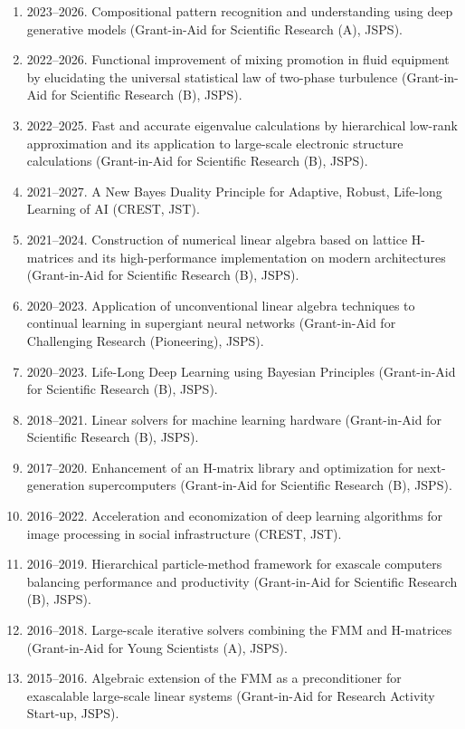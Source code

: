 \documentclass[margin,line]{cv}
\begin{document}
\begin{resume}
\begin{enumerate}
\item 2023--2026. Compositional pattern recognition and understanding using deep generative models (Grant-in-Aid for Scientific Research (A), JSPS).

\item 2022--2026. Functional improvement of mixing promotion in fluid equipment by elucidating the universal statistical law of two-phase turbulence (Grant-in-Aid for Scientific Research (B), JSPS).

\item 2022--2025. Fast and accurate eigenvalue calculations by hierarchical low-rank approximation and its application to large-scale electronic structure calculations (Grant-in-Aid for Scientific Research (B), JSPS).

\item 2021--2027. A New Bayes Duality Principle for Adaptive, Robust, Life-long Learning of AI (CREST, JST).

\item 2021--2024. Construction of numerical linear algebra based on lattice H-matrices and its high-performance implementation on modern architectures (Grant-in-Aid for Scientific Research (B), JSPS).

\item 2020--2023. Application of unconventional linear algebra techniques to continual learning in supergiant neural networks (Grant-in-Aid for Challenging Research (Pioneering), JSPS).

\item 2020--2023. Life-Long Deep Learning using Bayesian Principles (Grant-in-Aid for Scientific Research (B), JSPS).

\item 2018--2021. Linear solvers for machine learning hardware (Grant-in-Aid for Scientific Research (B), JSPS).

\item 2017--2020. Enhancement of an H-matrix library and optimization for next-generation supercomputers (Grant-in-Aid for Scientific Research (B), JSPS).

\item 2016--2022. Acceleration and economization of deep learning algorithms for image processing in social infrastructure (CREST, JST).

\item 2016--2019. Hierarchical particle-method framework for exascale computers balancing performance and productivity (Grant-in-Aid for Scientific Research (B), JSPS).

\item 2016--2018. Large-scale iterative solvers combining the FMM and H-matrices (Grant-in-Aid for Young Scientists (A), JSPS).

\item 2015--2016. Algebraic extension of the FMM as a preconditioner for exascalable large-scale linear systems (Grant-in-Aid for Research Activity Start-up, JSPS).

\end{enumerate}

\end{resume}
\end{document}
